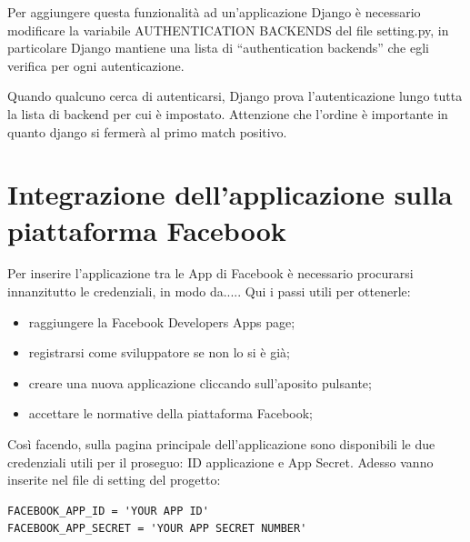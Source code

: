 Per aggiungere questa funzionalità ad un'applicazione Django è necessario modificare la variabile AUTHENTICATION BACKENDS del file setting.py, in particolare Django mantiene una lista di “authentication backends” che egli verifica per ogni autenticazione. 


Quando qualcuno cerca di autenticarsi, Django prova l'autenticazione lungo tutta la lista di backend per cui è impostato. 
Attenzione che l'ordine è importante in quanto django si fermerà al primo match positivo.


\section{Integrazione dell'applicazione sulla piattaforma Facebook}
Per inserire l'applicazione tra le App di Facebook è necessario procurarsi innanzitutto le credenziali, in modo da.....
Qui i passi utili per ottenerle:
\begin{itemize}
	\item raggiungere la Facebook Developers Apps page;
	\item registrarsi come sviluppatore se non lo si è già;
	\item creare una nuova applicazione cliccando sull'aposito pulsante;
	\item accettare le normative della piattaforma Facebook;
\end{itemize}
Così facendo, sulla pagina principale dell'applicazione sono disponibili le due credenziali utili per il proseguo: ID applicazione e App Secret.
Adesso vanno inserite nel file di setting del progetto:

\begin{lstlisting}
FACEBOOK_APP_ID = 'YOUR APP ID'
FACEBOOK_APP_SECRET = 'YOUR APP SECRET NUMBER'
\end{lstlisting}



